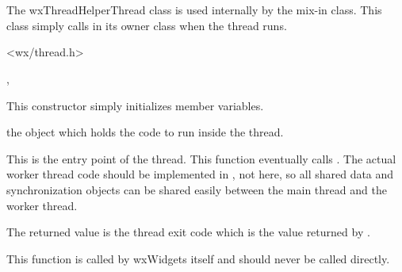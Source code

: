 \section{}\label{wxThreadHelperThread}

The wxThreadHelperThread class is used internally by the
 mix-in class.  This class simply
calls  in its owner class
when the thread runs.




<wx/thread.h>


, 


\label{wxthreadhelperthreadctor}


This constructor simply initializes member variables.

\label{wxthreadhelperthreadmowner}


the  object which holds the code to
run inside the thread.

\label{wxthreadhelperthreadentry}


This is the entry point of the thread.  This function eventually calls
.  The actual worker
thread code should be implemented in
, not here, so all
shared data and synchronization objects can be shared easily between the
main thread and the worker thread.

The returned value is the thread exit code which is the value returned by
.

This function is called by wxWidgets itself and should never be called
directly.

\label{wxthreadhelperthreadcallentry}

